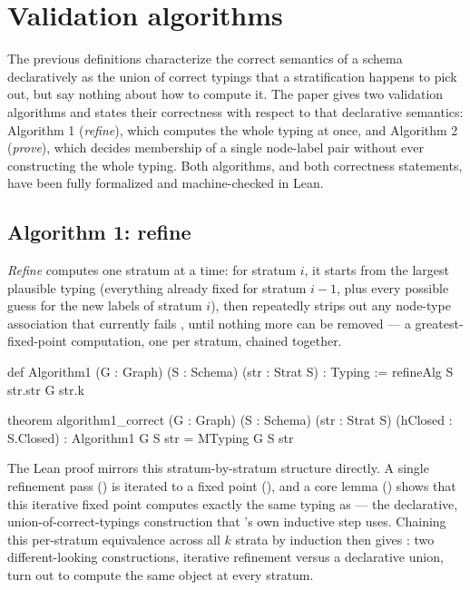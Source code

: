 \section{Validation algorithms} \label{sec:algorithms}

 The previous definitions characterize the correct semantics of a schema
 declaratively as the union of correct typings that a stratification
 happens to pick out, but say nothing about how to compute it.
 The paper
 gives two validation algorithms and states their correctness with respect
 to that declarative semantics:
 Algorithm 1 (\emph{refine}), which computes
 the whole typing  at once,
 and Algorithm 2
 (\emph{prove}), which decides membership of a single node-label pair
 without ever constructing the whole typing. Both algorithms, and both
 correctness statements, have been fully formalized and machine-checked in
 Lean.

\subsection{Algorithm 1: refine}

\emph{Refine} computes one stratum at a time: for stratum $i$, it starts
 from the largest plausible typing (everything already fixed for stratum
 $i-1$, plus every possible guess for the new labels of stratum $i$), then
 repeatedly strips out any node-type association that currently fails
 , until nothing more can be removed --- a greatest-fixed-point
 computation, one per stratum, chained together.

\begin{leanlisting}
def Algorithm1 (G : Graph) (S : Schema) (str : Strat S) : Typing :=
  refineAlg S str.str G str.k

theorem algorithm1_correct (G : Graph) (S : Schema) (str : Strat S)
    (hClosed : S.Closed) : Algorithm1 G S str = MTyping G S str
\end{leanlisting}

The Lean proof mirrors this stratum-by-stratum structure directly. A
single refinement pass () is iterated to a fixed point
(), and a core lemma () shows that
this iterative fixed point computes exactly the same typing as
 --- the declarative, union-of-correct-typings construction
that 's own inductive step uses. Chaining this per-stratum
equivalence across all $k$ strata by induction then gives
: two different-looking constructions,
iterative refinement versus a declarative union, turn out to compute the
same object at every stratum.

